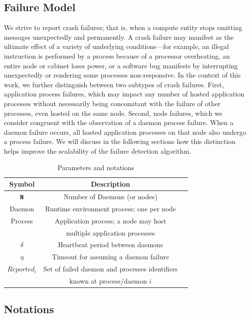 \documentclass[sigconf]{acmart}
\begin{document}
\subsection{Failure Model}

We strive to report crash failures; that is, when a compute entity stops emitting
messages unexpectedly and permanently. A crash failure may manifest as
the ultimate effect of a variety of underlying conditions---for example, an illegal instruction
is performed by a process because of a processor overheating, an entire
node or cabinet loses power, or a software bug manifests by interrupting
unexpectedly or rendering some processes non-responsive. In the context of
this work, we further distinguish between two subtypes of crash failures.
First, application process failures, which may impact any number of
hosted application processes without necessarily being concomitant
with the failure of other processes, even hosted on the same node.
Second, node failures, which we consider congruent with the observation of a daemon
process failure. When a daemon failure occurs, all hosted application processes on
that node also undergo a process failure. We will discuss in the following
sections how this distinction helps improve the scalability of the failure
detection algorithm.

\begin{table}
  \caption{Parameters and notations}\label{fig:notations}
  \label{tab:parameters}
  \small
  \begin{tabular}{ccl}
    \toprule
    Symbol & Description \\
    \midrule
    \texttt{\bf N} & Number of Daemons (or nodes) \\
    Daemon & Runtime environment process; one per node\\
    Process & Application process; a node may host \\& multiple application processes \\
    $\delta$ & Heartbeat period between daemons\\
    $\eta$ & Timeout for assuming a daemon failure\\
    $Reported_i$ & Set of failed daemon and processes identifiers\\
                 & known at process/daemon $i$ \\
    \bottomrule
  \end{tabular}
\end{table}

\subsection{Notations}
\end{document}
